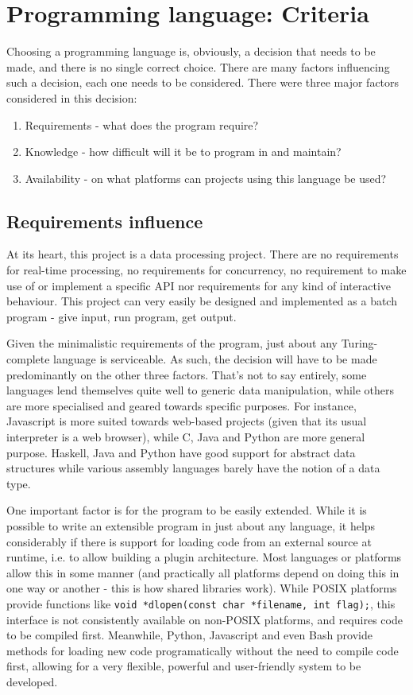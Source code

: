 \documentclass[10pt,a4paper,notitlepage]{report}
\begin{document}
\section{Programming language: Criteria}
Choosing a programming language is, obviously, a decision that needs to be made, and there is no single correct choice. There are many factors influencing such a decision, each one needs to be considered. There were three major factors considered in this decision:
\begin{enumerate}[label=\roman*)]
\item Requirements - what does the program require?
\item Knowledge - how difficult will it be to program in and maintain?
\item Availability - on what platforms can projects using this language be used?
\end{enumerate}

\subsection{Requirements influence}
At its heart, this project is a data processing project. There are no requirements for real-time processing, no requirements for concurrency, no requirement to make use of or implement a specific API nor requirements for any kind of interactive behaviour. This project can very easily be designed and implemented as a batch program - give input, run program, get output.

Given the minimalistic requirements of the program, just about any Turing-complete language is serviceable. As such, the decision will have to be made predominantly on the other three factors. That's not to say entirely, some languages lend themselves quite well to generic data manipulation, while others are more specialised and geared towards specific purposes. For instance, Javascript is more suited towards web-based projects (given that its usual interpreter is a web browser), while C, Java and Python are more general purpose. Haskell, Java and Python have good support for abstract data structures while various assembly languages barely have the notion of a data type.

One important factor is for the program to be easily extended. While it is possible to write an extensible program in just about any language, it helps considerably if there is support for loading code from an external source at runtime, i.e. to allow building a plugin architecture.
Most languages or platforms allow this in some manner (and practically all platforms depend on doing this in one way or another - this is how shared libraries work). While POSIX platforms provide functions like \lstinline$void *dlopen(const char *filename, int flag);$, this interface is not consistently available on non-POSIX platforms, and requires code to be compiled first. Meanwhile, Python, Javascript and even Bash provide methods for loading new code programatically without the need to compile code first, allowing for a very flexible, powerful and user-friendly system to be developed.
\end{document}
